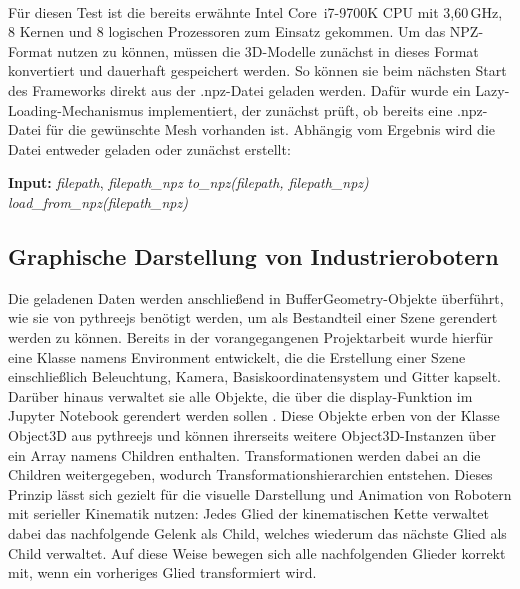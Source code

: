 Für diesen Test ist die bereits erwähnte Intel\textsuperscript{\textregistered} Core\texttrademark\ i7-9700K CPU mit 3,60\,GHz, 8 Kernen und 8 logischen Prozessoren zum Einsatz gekommen.
Um das NPZ-Format nutzen zu können, müssen die 3D-Modelle zunächst in dieses Format konvertiert und dauerhaft gespeichert werden.
So können sie beim nächsten Start des Frameworks direkt aus der .npz-Datei geladen werden.
Dafür wurde ein Lazy-Loading-Mechanismus implementiert, der zunächst prüft, ob bereits eine .npz-Datei für die gewünschte Mesh vorhanden ist.
Abhängig vom Ergebnis wird die Datei entweder geladen oder zunächst erstellt:

\vspace{1em}
    \begin{algorithm}
        \caption{Laden eines 3D-Modells aus einer NPZ-Datei}
        \begin{algorithmic}[1]
            \State \textbf{Input:} \textit{filepath}, \textit{filepath\_npz}
                \State \textit{to\_npz(filepath, filepath\_npz)}
            \EndIf
            \State \Return \textit{load\_from\_npz(filepath\_npz)}
        \end{algorithmic}
    \end{algorithm}
\vspace{1em}












\subsection{Graphische Darstellung von Industrierobotern}

Die geladenen Daten werden anschließend in BufferGeometry-Objekte überführt, wie sie von pythreejs benötigt werden, 
um als Bestandteil einer Szene gerendert werden zu können. 
Bereits in der vorangegangenen Projektarbeit wurde hierfür eine Klasse namens Environment entwickelt, 
die die Erstellung einer Szene einschließlich Beleuchtung, Kamera, Basiskoordinatensystem und Gitter kapselt. 
Darüber hinaus verwaltet sie alle Objekte, die über die display-Funktion im Jupyter Notebook gerendert werden sollen .
Diese Objekte erben von der Klasse Object3D aus pythreejs und können ihrerseits weitere Object3D-Instanzen über ein Array namens Children enthalten. 
Transformationen werden dabei an die Children weitergegeben, wodurch Transformationshierarchien entstehen. 
Dieses Prinzip lässt sich gezielt für die visuelle Darstellung und Animation von Robotern mit serieller Kinematik nutzen: 
Jedes Glied der kinematischen Kette verwaltet dabei das nachfolgende Gelenk als Child, welches wiederum das nächste Glied als Child verwaltet. 
Auf diese Weise bewegen sich alle nachfolgenden Glieder korrekt mit, wenn ein vorheriges Glied transformiert wird.

